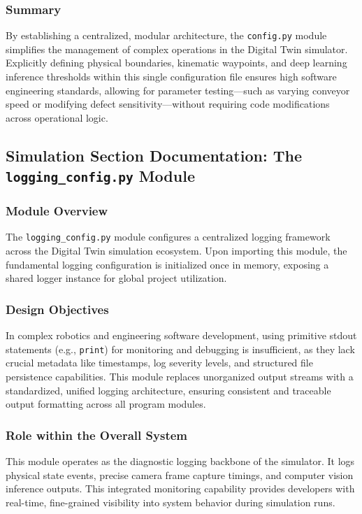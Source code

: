 \documentclass{article}
\begin{document}
\subsubsection{Summary}
By establishing a centralized, modular architecture, the \texttt{config.py} module simplifies the management of complex operations in the Digital Twin simulator. Explicitly defining physical boundaries, kinematic waypoints, and deep learning inference thresholds within this single configuration file ensures high software engineering standards, allowing for parameter testing—such as varying conveyor speed or modifying defect sensitivity—without requiring code modifications across operational logic.

\subsection{Simulation Section Documentation: The \texttt{logging\_config.py} Module}

\subsubsection{Module Overview}
The \texttt{logging\_config.py} module configures a centralized logging framework across the Digital Twin simulation ecosystem. Upon importing this module, the fundamental logging configuration is initialized once in memory, exposing a shared logger instance for global project utilization.

\subsubsection{Design Objectives}
In complex robotics and engineering software development, using primitive stdout statements (e.g., \texttt{print}) for monitoring and debugging is insufficient, as they lack crucial metadata like timestamps, log severity levels, and structured file persistence capabilities. This module replaces unorganized output streams with a standardized, unified logging architecture, ensuring consistent and traceable output formatting across all program modules.

\subsubsection{Role within the Overall System}
This module operates as the diagnostic logging backbone of the simulator. It logs physical state events, precise camera frame capture timings, and computer vision inference outputs. This integrated monitoring capability provides developers with real-time, fine-grained visibility into system behavior during simulation runs.
\end{document}
